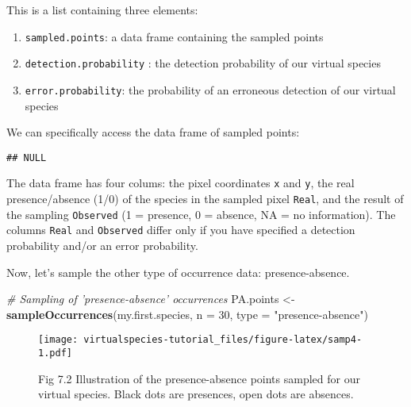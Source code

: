 \documentclass[]{article}
\newenvironment{Shaded}{\begin{snugshade}}{\end{snugshade}}
\newcommand{\KeywordTok}[1]{\textcolor[rgb]{0.13,0.29,0.53}{\textbf{#1}}}
\newcommand{\DataTypeTok}[1]{\textcolor[rgb]{0.13,0.29,0.53}{#1}}
\newcommand{\DecValTok}[1]{\textcolor[rgb]{0.00,0.00,0.81}{#1}}
\newcommand{\StringTok}[1]{\textcolor[rgb]{0.31,0.60,0.02}{#1}}
\newcommand{\CommentTok}[1]{\textcolor[rgb]{0.56,0.35,0.01}{\textit{#1}}}
\newcommand{\OperatorTok}[1]{\textcolor[rgb]{0.81,0.36,0.00}{\textbf{#1}}}
\newcommand{\NormalTok}[1]{#1}
\providecommand{\tightlist}{%
  \setlength{\itemsep}{0pt}\setlength{\parskip}{0pt}}
\begin{document}
This is a list containing three elements:

\begin{enumerate}
\def\labelenumi{\arabic{enumi}.}
\tightlist
\item
  \texttt{sampled.points}: a data frame containing the sampled points
\item
  \texttt{detection.probability} : the detection probability of our
  virtual species
\item
  \texttt{error.probability}: the probability of an erroneous detection
  of our virtual species
\end{enumerate}

We can specifically access the data frame of sampled points:

\begin{Shaded}
\end{Shaded}

\begin{verbatim}
## NULL
\end{verbatim}

The data frame has four colums: the pixel coordinates \texttt{x} and
\texttt{y}, the real presence/absence (1/0) of the species in the
sampled pixel \texttt{Real}, and the result of the sampling
\texttt{Observed} (1 = presence, 0 = absence, NA = no information). The
columns \texttt{Real} and \texttt{Observed} differ only if you have
specified a detection probability and/or an error probability.

Now, let's sample the other type of occurrence data: presence-absence.

\begin{Shaded}
\begin{Highlighting}[]
\CommentTok{# Sampling of 'presence-absence' occurrences}
\NormalTok{PA.points <-}\StringTok{ }\KeywordTok{sampleOccurrences}\NormalTok{(my.first.species,}
                               \DataTypeTok{n =} \DecValTok{30}\NormalTok{,}
                               \DataTypeTok{type =} \StringTok{"presence-absence"}\NormalTok{)}
\end{Highlighting}
\end{Shaded}

\begin{figure}
\centering
\texttt{[image: virtualspecies-tutorial\_files/figure-latex/samp4-1.pdf]}
\caption{Fig 7.2 Illustration of the presence-absence points sampled for
our virtual species. Black dots are presences, open dots are absences.}
\end{figure}
\end{document}

